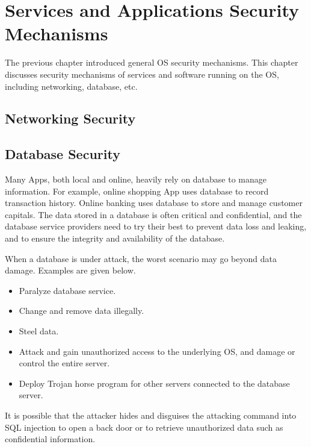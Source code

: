 \chapter{Services and Applications Security Mechanisms}

The previous chapter introduced general OS security mechanisms. This chapter discusses security mechanisms of services and software running on the OS, including networking, database, etc.

\section{Networking Security}

\section{Database Security}

Many Apps, both local and online, heavily rely on database to manage information. For example, online shopping App uses database to record transaction history. Online banking uses database to store and manage customer capitals. The data stored in a database is often critical and confidential, and the database service providers need to try their best to prevent data loss and leaking, and to ensure the integrity and availability of the database.

When a database is under attack, the worst scenario may go beyond data damage. Examples are given below.
\begin{itemize}
	\item Paralyze database service.
	\item Change and remove data illegally.
	\item Steel data.
	\item Attack and gain unauthorized access to the underlying OS, and damage or control the entire server.
	\item Deploy Trojan horse program for other servers connected to the database server.
\end{itemize}

It is possible that the attacker hides and disguises the attacking command into SQL injection to open a back door or to retrieve unauthorized data such as confidential information.

